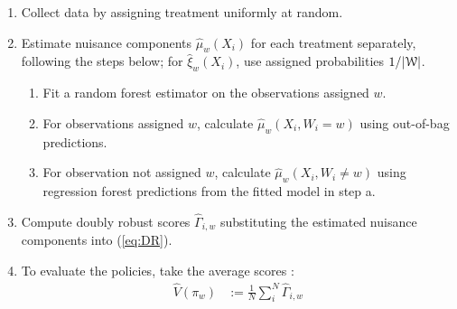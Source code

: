 \documentclass[letterpaper, 12pt, parskip=full,]{scrartcl}
\begin{document}

\begin{enumerate}
  \item Collect data by assigning treatment uniformly at random.
  \item Estimate nuisance components $\hat{\mu}_{w}(X_i)$ for each treatment separately, following the steps below; for  $\hat\xi_w(X_i)$, use assigned probabilities $1/|{\EuScript W}|$. 
\begin{enumerate}
\item Fit a random forest estimator on the observations assigned $w$. 
\item For observations assigned $w$, calculate $\hat\mu_w(X_i, W_i = w)$ using out-of-bag predictions. 
\item For observation not assigned $w$, calculate $\hat\mu_w(X_i, W_i \neq w)$ using regression forest predictions from the fitted model in step a. 
\end{enumerate}
  \item Compute doubly robust scores $\hat{\Gamma}_{i,w}$ substituting the estimated nuisance components into (\ref{eq:DR}). 
  \item To evaluate the policies, take the average scores :
    \begin{align*}
          \hat{V}({\pi}_{w})  &:= \frac{1}{N} \sum_{i}^N \hat{\Gamma}_{i,w} \\

\end{align*}
\end{enumerate}
\end{document}

